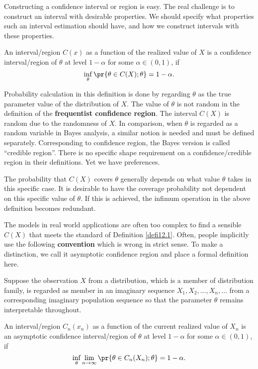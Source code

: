Constructing a confidence interval or region is easy. 
The real challenge is to construct an interval with desirable properties. 
We should specify what properties such an interval estimation should have, 
and how we construct intervals with these properties.

\begin{defi}
\label{defi12.1}
An interval/region $C(x)$ as a function of the realized value of $X$ is a
confidence interval/region of $\theta$ at level $1 - \alpha$ for some
$\alpha \in (0, 1)$, if
\[
\inf_{\theta} \pr \{\theta \in C(X); \theta \} = 1 - \alpha.
\]
\end{defi}

Probability calculation in this definition is done by regarding
$\theta$ as the true parameter value of the distribution of $X$.
The value of $\theta$ is not random in the definition of the
{\bf  frequentist confidence region}. 
The interval $C(X)$ is random due to the randomness of $X$. 
In comparison, when $\theta$ is regarded as a random variable in Bayes analysis,
a similar notion is needed and must be defined separately.
Corresponding to confidence region, the Bayes version is called ``credible region''. 
There is no specific shape requirement on a confidence/credible region in their definitions.
Yet we have preferences.

The probability that $C(X)$ covers $\theta$ generally depends on
what value $\theta$ takes in this specific case.
It is desirable to have the coverage probability not dependent on this specific value of $\theta$. 
If this is achieved, the infimum operation in the above definition becomes redundant. 

The models in real world applications are often too complex to
find a sensible $C(X)$ that meets the standard of Definition \ref{defi12.1}. 
Often, people implicitly use the following {\bf convention} which is wrong in strict sense. 
To make a distinction, we call it asymptotic confidence region and place a formal
definition here.

\begin{defi}
\label{defi12.2}
Suppose the observation $X$ from a distribution, which is a member of
distribution family, is regarded as member in an imaginary sequence 
$X_1, X_2, \ldots, X_n, \ldots$ from a corresponding imaginary population 
sequence so that the parameter $\theta$ remains interpretable throughout.

An interval/region $C_n(x_n)$ as a function of the current realized value of $X_n$ is an asymptotic
confidence interval/region of $\theta$ at level $1 - \alpha$ for some $\alpha \in (0, 1)$, if
\[
\inf_{\theta} \lim_{n \to \infty} \pr \{\theta \in C_n(X_n); \theta \} = 1 - \alpha.
\]
\end{defi}

